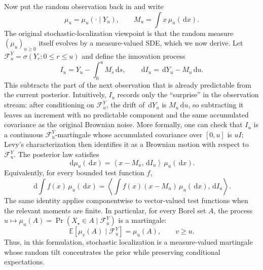 \documentclass[10pt,a4paper]{amsart}
\numberwithin{equation}{section}
\newcommand{\E}{\mathbb{E}}
\newcommand{\dd}{\,\mathrm{d}}
\newcommand{\Id}{I}
\newcommand{\cF}{\mathcal{F}}
\newcommand{\ip}[2]{\left\langle #1,#2 \right\rangle}
\begin{document}
Now put the random observation back in and write
\[
    \mu_u=\mu_u(\cdot\mid Y_u),
    \qquad
    M_u=\int x\,\mu_u(\dd x).
\]
The original stochastic-localization viewpoint is that the random measure
$(\mu_u)_{u\geq0}$ itself evolves by a measure-valued SDE, which we now derive.  Let
$\cF_u^Y=\sigma(Y_r:0\leq r\leq u)$ and define the innovation process
\[
    I_u=Y_u-\int_0^u M_s\dd s,
    \qquad
    \dd I_u=\dd Y_u-M_u\dd u.
\]
This subtracts the part of the next observation that is already predictable
from the current posterior.  Intuitively, $I_u$ records only the ``surprise'' in
the observation stream: after conditioning on $\cF_u^Y$, the drift of
$\dd Y_u$ is $M_u\dd u$, so subtracting it leaves an increment with no
predictable component and the same accumulated covariance as the original
Brownian noise.  More formally, one can check that $I_u$ is a continuous
$\cF_u^Y$-martingale whose accumulated covariance over $[0,u]$ is $u\Id$;
Levy's characterization then identifies it as a Brownian motion with respect
to $\cF_u^Y$.  The posterior law satisfies
\begin{equation}\label{eq:sl-measure-sde}
    \dd \mu_u(\dd x)
    =
    \ip{x-M_u}{\dd I_u}\,\mu_u(\dd x).
\end{equation}
Equivalently, for every bounded test function $f$,
\[
    \dd\int f(x)\,\mu_u(\dd x)
    =
    \ip{\int f(x)(x-M_u)\,\mu_u(\dd x)}{\dd I_u}.
\]
The same identity applies componentwise to vector-valued test functions when
the relevant moments are finite.
In particular, for every Borel set $A$, the process
$u\mapsto\mu_u(A)=\Pr(X_\star\in A\mid\cF_u^Y)$ is a martingale:
\[
    \E[\mu_v(A)\mid\cF_u^Y]=\mu_u(A),
    \qquad v\geq u.
\]
Thus, in this formulation, stochastic localization is a measure-valued
martingale whose random tilt concentrates the prior while preserving
conditional expectations.
\end{document}
